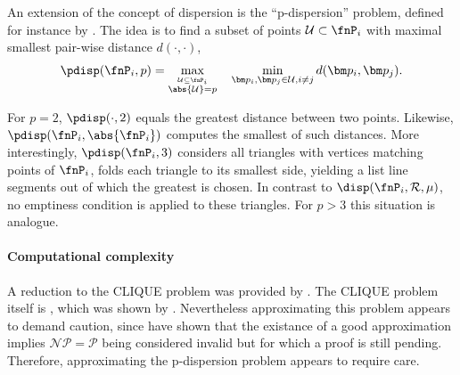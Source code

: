 %
An extension of the concept of dispersion is the \enquote{p-dispersion} problem, defined for instance by . The idea is to find a subset of points $\mathcal U \subset \fnP_i$ with maximal smallest pair-wise distance $d(\cdot,\cdot)$,
\begin{align}\label{eq:pdisp}
  \pdisp(\fnP_i, p) = \max_{\stackrel{\mathcal U \subseteq \fnP_i}{\abs{\mathcal U} = p}} \quad\min_{\bm p_i, \bm p_j \in \mathcal U, i \neq j} d(\bm p_i, \bm p_j).
\end{align}

For $p=2$, $\pdisp(\cdot,2)$ equals the greatest distance between two points. Likewise, $\pdisp(\fnP_i, \abs{\fnP_i})$ computes the smallest of such distances. More interestingly, $\pdisp(\fnP_i,3)$ considers all triangles with vertices matching points of $\fnP_i$, folds each triangle to its smallest side, yielding a list line segments out of which the greatest is chosen. In contrast to $\disp(\fnP_i, \mathcal R, \mu)$, no emptiness condition is applied to these triangles. For $p>3$ this situation is analogue.

\paragraph{Computational complexity}

A reduction to the CLIQUE problem was provided by . The CLIQUE problem itself is \ccNPcomplete, which was shown by . Nevertheless approximating this problem appears to demand caution, since  have shown that the existance of a good approximation implies $\mathcal{NP} = \mathcal{P}$ being considered invalid but for which a proof is still pending. Therefore, approximating the p-dispersion problem appears to require care.
